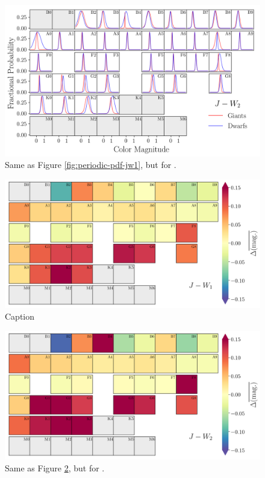 \begin{figure}
    \centering
    \includegraphics[width=1.0\textwidth,clip=true]{Figures/periodic/periodic-t-pdf_J_W2.png}
    \caption{Same as Figure \ref{fig:periodic-pdf-jw1}, but for \jwtwo.}
    \label{fig:periodic-pdf-jw2}
\end{figure}

\begin{figure}
    \centering
    \includegraphics[width=1.0\textwidth,clip=true]{Figures/periodic/periodic-delta_J_W1.png}
    \caption{Caption}
    \label{fig:periodic-delta-jw1}
\end{figure}

\begin{figure}
    \centering
    \includegraphics[width=1.0\textwidth,clip=true]{Figures/periodic/periodic-delta_J_W2.png}
    \caption{Same as Figure \ref{fig:periodic-delta-jw1}, but for \jwtwo.}
    \label{fig:periodic-delta-jw2}
\end{figure}

